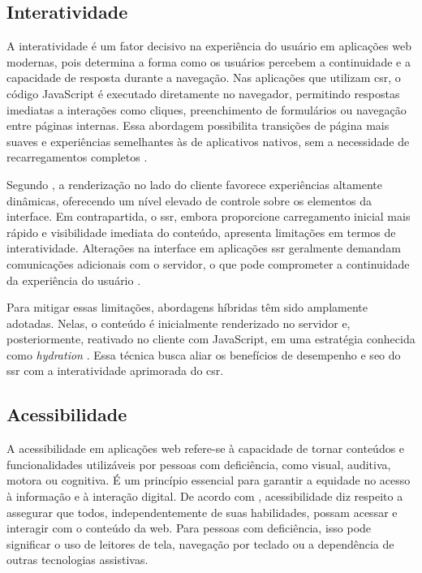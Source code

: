 \subsection{Interatividade}
\label{subsec:interatividade}

A interatividade é um fator decisivo na experiência do usuário em aplicações web modernas, pois determina a forma como os usuários percebem a continuidade e a capacidade de resposta durante a navegação. Nas aplicações que utilizam \acrshort{csr}, o código JavaScript é executado diretamente no navegador, permitindo respostas imediatas a interações como cliques, preenchimento de formulários ou navegação entre páginas internas. Essa abordagem possibilita transições de página mais suaves e experiências semelhantes às de aplicativos nativos, sem a necessidade de recarregamentos completos \cite{pixelfree2023}.

Segundo , a renderização no lado do cliente favorece experiências altamente dinâmicas, oferecendo um nível elevado de controle sobre os elementos da interface. Em contrapartida, o \acrshort{ssr}, embora proporcione carregamento inicial mais rápido e visibilidade imediata do conteúdo, apresenta limitações em termos de interatividade. Alterações na interface em aplicações \acrshort{ssr} geralmente demandam comunicações adicionais com o servidor, o que pode comprometer a continuidade da experiência do usuário \cite{atori2024, splunk2023}.

Para mitigar essas limitações, abordagens híbridas têm sido amplamente adotadas. Nelas, o conteúdo é inicialmente renderizado no servidor e, posteriormente, reativado no cliente com JavaScript, em uma estratégia conhecida como \emph{hydration} \cite{splunk2023}. Essa técnica busca aliar os benefícios de desempenho e \acrshort{seo} do \acrshort{ssr} com a interatividade aprimorada do \acrshort{csr}.


\subsection{Acessibilidade}
\label{subsec:acessibilidade}

A acessibilidade em aplicações web refere-se à capacidade de tornar conteúdos e funcionalidades utilizáveis por pessoas com deficiência, como visual, auditiva, motora ou cognitiva. É um princípio essencial para garantir a equidade no acesso à informação e à interação digital. De acordo com \cite{pixelfree2023access}, acessibilidade diz respeito a assegurar que todos, independentemente de suas habilidades, possam acessar e interagir com o conteúdo da web. Para pessoas com deficiência, isso pode significar o uso de leitores de tela, navegação por teclado ou a dependência de outras tecnologias assistivas.

